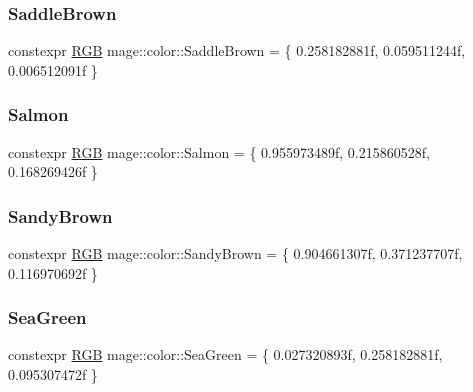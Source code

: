 \mbox{\label{namespacemage_1_1color_a86715103a7b44781b3193c280e61eac2}} 
\subsubsection{\texorpdfstring{Saddle\+Brown}{SaddleBrown}}
{\footnotesize\ttfamily constexpr \mbox{\hyperlink{structmage_1_1_r_g_b}{R\+GB}} mage\+::color\+::\+Saddle\+Brown = \{ 0.\+258182881f, 0.\+059511244f, 0.\+006512091f \}}

\mbox{\label{namespacemage_1_1color_a16d2bfe7068032f09cb8b8caeac239a8}} 
\subsubsection{\texorpdfstring{Salmon}{Salmon}}
{\footnotesize\ttfamily constexpr \mbox{\hyperlink{structmage_1_1_r_g_b}{R\+GB}} mage\+::color\+::\+Salmon = \{ 0.\+955973489f, 0.\+215860528f, 0.\+168269426f \}}

\mbox{\label{namespacemage_1_1color_a60814a5e21ce5f83b39a68435307ebac}} 
\subsubsection{\texorpdfstring{Sandy\+Brown}{SandyBrown}}
{\footnotesize\ttfamily constexpr \mbox{\hyperlink{structmage_1_1_r_g_b}{R\+GB}} mage\+::color\+::\+Sandy\+Brown = \{ 0.\+904661307f, 0.\+371237707f, 0.\+116970692f \}}

\mbox{\label{namespacemage_1_1color_a20147160d6224370ec0022225c7b1b3f}} 
\subsubsection{\texorpdfstring{Sea\+Green}{SeaGreen}}
{\footnotesize\ttfamily constexpr \mbox{\hyperlink{structmage_1_1_r_g_b}{R\+GB}} mage\+::color\+::\+Sea\+Green = \{ 0.\+027320893f, 0.\+258182881f, 0.\+095307472f \}}

